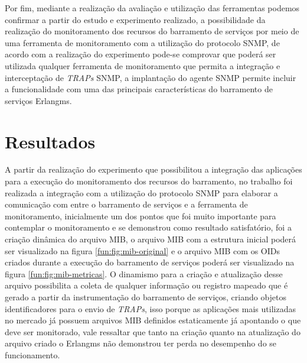 Por fim, mediante a realização da avaliação e utilização das ferramentas podemos confirmar a partir do estudo e experimento realizado, a possibilidade da realização do monitoramento dos recursos do barramento de serviços por meio de uma ferramenta de monitoramento com a utilização do protocolo \acrshort{SNMP}, de acordo com a realização do experimento pode-se comprovar que poderá ser utilizada qualquer ferramenta de monitoramento que permita a integração e interceptação de \textit{TRAPs} \acrshort{SNMP}, a implantação do agente \acrshort{SNMP} permite incluir a funcionalidade com uma das principais características do barramento de serviços Erlangms.   



\section{Resultados}
\label{resultados}

A partir da realização do experimento que possibilitou a integração das aplicações para a execução do monitoramento dos recursos do barramento, no trabalho foi realizada a integração com a utilização do protocolo \acrshort{SNMP} para elaborar a comunicação com entre o barramento de serviços e a ferramenta de monitoramento, inicialmente um dos pontos que foi muito importante para contemplar o monitoramento e se demonstrou como resultado satisfatório, foi a criação dinâmica do arquivo MIB, o arquivo MIB com a estrutura inicial poderá ser visualizado na figura \ref{fun:fig:mib-original} e o arquivo MIB com os \acrshort{OID}s criados durante a execução do barramento de serviços poderá ser visualizado na figura \ref{fun:fig:mib-metricas}. O dinamismo para a criação e atualização desse arquivo possibilita a coleta de qualquer informação ou registro mapeado que é gerado a partir da instrumentação do barramento de serviços, criando objetos identificadores para o envio de \textit{TRAPs}, isso porque as aplicações mais utilizadas no mercado já possuem arquivos MIB definidos estaticamente já apontando o que deve ser monitorado, vale ressaltar que tanto na criação quanto na atualização do arquivo criado o Erlangms não demonstrou ter perda no desempenho do se funcionamento.

